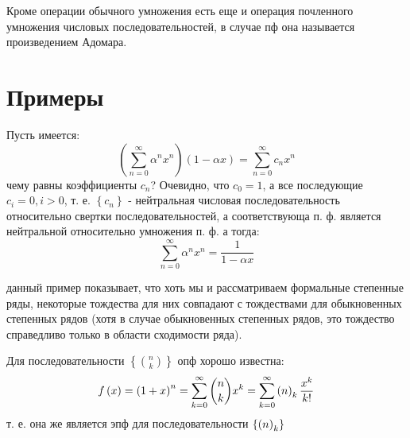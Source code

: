 Кроме операции обычного умножения есть еще и операция почленного умножения числовых последовательностей, в случае пф она называется произведением Адомара.

\section{Примеры}

Пусть имеется: $$ \left(\sum_{n=0}^{\infty} \alpha^nx^n\right)\left(1-\alpha x\right) = \sum_{n=0}^{\infty} c_n x^n $$ чему равны коэффициенты $c_n$? Очевидно, что $c_0 = 1$, а все последующие $c_i = 0, i>0$, т. е. $\left\{c_n\right\}$ - нейтральная числовая последовательность относительно свертки последовательностей, а соответствующа п. ф. является нейтральной относительно умножения п. ф. а тогда:
\begin{equation}
	\sum_{n=0}^{\infty} \alpha^n x^n = \frac{1}{1 - \alpha x}
\end{equation}

данный пример показывает, что хоть мы и рассматриваем формальные степенные ряды, некоторые тождества для них совпадают с тождествами для обыкновенных степенных рядов (хотя в случае обыкновенных степенных рядов, это тождество справедливо только в области сходимости ряда).

Для последовательности $\left\{\binom{n}{k}\right\}$ опф хорошо известна:
\begin{equation}
	f\left(x\right) = \left(1+x\right)^n = \sum_{k=0}^{\infty} \binom{n}{k}x^k = \sum_{k=0}^{\infty} \left({n}\right)_{k} \frac{x^k}{k!}
\end{equation}
т. е. она же является эпф для последовательности $\left\{\left({n}\right)_{k}\right\}$
